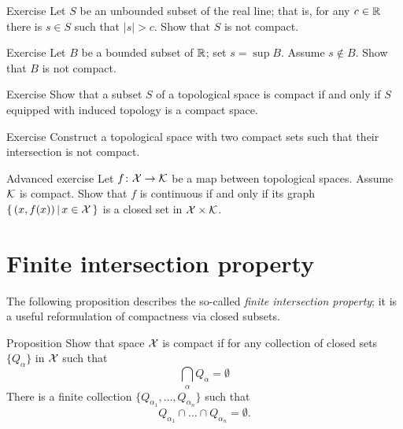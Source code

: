\begin{thm}{Exercise}
Let $S$ be an unbounded subset of the real line; that is, for any $c\in \mathbb{R}$ there is $s\in S$ such that $|s|>c$.
Show that $S$ is not compact.

\end{thm}

\begin{thm}{Exercise}
Let $B$ be a bounded subset of $\mathbb{R}$; set $s=\sup B$.
Assume $s\notin B$.
Show that $B$ is not compact.

\end{thm}

\begin{thm}{Exercise}
Show that a subset $S$ of a topological space is compact if and only if $S$ equipped with induced topology is a compact space.
\end{thm}

\begin{thm}{Exercise}
Construct a topological space with two compact sets such that their intersection is not compact.
\end{thm}

\begin{thm}{Advanced exercise} Let $f\colon\mathcal{X}\to\mathcal{K}$ be a map between topological spaces.
Assume $\mathcal{K}$ is compact.
Show that $f$ is continuous if and only if its graph $\left\{\,{(x,f(x))}\,\middle|\,{x\in\mathcal{X}}\,\right\}$ is a closed set in $\mathcal{X}\times\mathcal{K}$. 
\end{thm}

\section{Finite intersection property}

The following proposition describes the so-called \emph{finite intersection property};
it is a useful reformulation of compactness via closed subsets. 

\begin{thm}{Proposition}
Show that space $\mathcal{X}$ is compact if for any collection of closed sets $\{Q_\alpha\}$ in $\mathcal{X}$ such that 
\[\bigcap_{\alpha}Q_\alpha=\emptyset\]
There is a finite collection $\{Q_{\alpha_1},\dots,Q_{\alpha_n}\}$
such that
\[Q_{\alpha_1}\cap\dots\cap Q_{\alpha_n}=\emptyset.\]

\end{thm}

